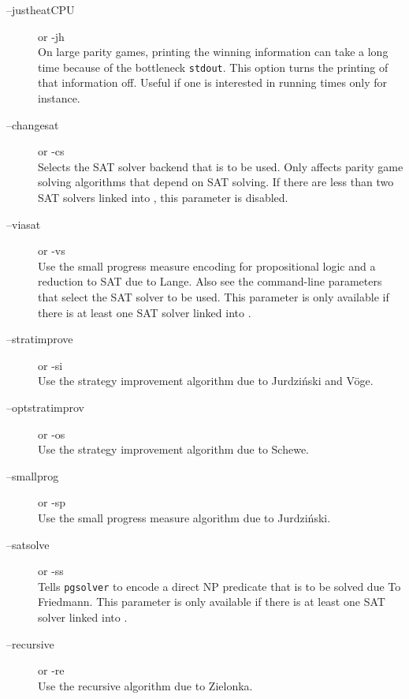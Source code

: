 \begin{description}
\item[{\ttfamily --justheatCPU}] \enspace or {\ttfamily -jh}  \\
   On large parity games, printing the winning information can take a long time because of the bottleneck
   \texttt{stdout}. This option turns the printing of that information off. Useful if one is interested in
   running times only for instance.

\item[{\ttfamily --changesat }] \enspace or {\ttfamily -cs }  \\
   Selects the SAT solver backend that is to be used. Only affects parity game solving algorithms that
   depend on SAT solving. If there are less than two SAT solvers linked into \pgsolver, this parameter
   is disabled.

\item[{\ttfamily --viasat}] \enspace or {\ttfamily -vs} \\
   Use the small progress measure encoding for propositional logic and a reduction to SAT due to Lange.
   Also see the command-line parameters that select the SAT solver to be used.
   This parameter is only available if there is at least one SAT solver linked into \pgsolver.

\item[{\ttfamily --stratimprove}] \enspace or {\ttfamily -si} \\
   Use the strategy improvement algorithm due to Jurdzi{\'n}ski and V\"oge.

\item[{\ttfamily  --optstratimprov}] \enspace or {\ttfamily -os} \\
   Use the strategy improvement algorithm due to Schewe.

\item[{\ttfamily --smallprog}] \enspace or {\ttfamily -sp} \\
   Use the small progress measure algorithm due to Jurdzi{\'n}ski.

\item[{\ttfamily --satsolve}] \enspace or {\ttfamily -ss} \\
   Tells \texttt{pgsolver} to encode a direct NP predicate that is to be solved due To Friedmann.
   This parameter is only available if there is at least one SAT solver linked into \pgsolver.

\item[{\ttfamily --recursive}] \enspace or {\ttfamily -re} \\
   Use the recursive algorithm due to Zielonka.


\end{description}
